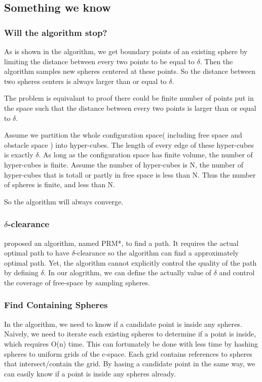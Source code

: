 \documentclass{article}
\begin{document}
	\subsection{Something we know}
		\subsubsection{Will the algorithm stop?}
 			\label{Finite number of spheres}
 			As is shown in the algorithm, we get boundary points of an existing sphere by limiting the distance between every two points to be equal to $\delta$. Then the algorithm samples new spheres centered at these points. So the distance between two spheres centers is always larger than or equal to $\delta$. 

 			The problem is equivalant to proof there could be finite number of points put in the space such that the distance between every two points is larger than or equal to $\delta$.

 			Assume we partition the whole configuration space( including free space and obstacle space ) into hyper-cubes. The length of every edge of these hyper-cubes is exactly $\delta$. As long as the configuration space has finite volume, the number of hyper-cubes is finite. Assume the number of hyper-cubes is N, the number of hyper-cubes that is totall or partly in free space is less than N. Thus the number of spheres is finite, and less than N.

 			So the algorithm will always converge.	

 		\subsubsection{$\delta$-clearance}
 			\cite{Karaman2011} proposed an algorithm, named PRM*, to find a path. It requires the actual optimal path to have $\delta$-clearance so the algorithm can find a approximately optimal path. Yet, the algorithm cannot explicitly control the quality of the path by defining $\delta$. In our alogrithm, we can define the actually value of $\delta$ and control the coverage of free-space by sampling spheres. 

 		\subsubsection{Find Containing Spheres}
 			In the algorithm, we need to know if a candidate point is inside any spheres. Naively, we need to iterate each existing spheres to determine if a point is inside, which requires O(n) time. This can fortunately be done with less time by hashing spheres to uniform grids of the c-space. Each grid contains references to spheres that intersect/contain the grid. By hasing a candidate point in the same way, we can easily know if a point is inside any spheres already.
\end{document}
